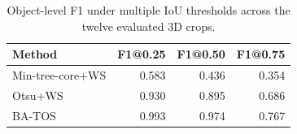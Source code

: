 \begin{table}[t]
\centering
\caption{Object-level F1 under multiple IoU thresholds across the twelve evaluated 3D crops.}
\label{tab:multi_iou}
\begin{tabular}{lrrr}
\hline
Method & F1@0.25 & F1@0.50 & F1@0.75 \\
\hline
Min-tree-core+WS & 0.583 & 0.436 & 0.354 \\
Otsu+WS & 0.930 & 0.895 & 0.686 \\
BA-TOS & 0.993 & 0.974 & 0.767 \\
\hline
\end{tabular}
\end{table}